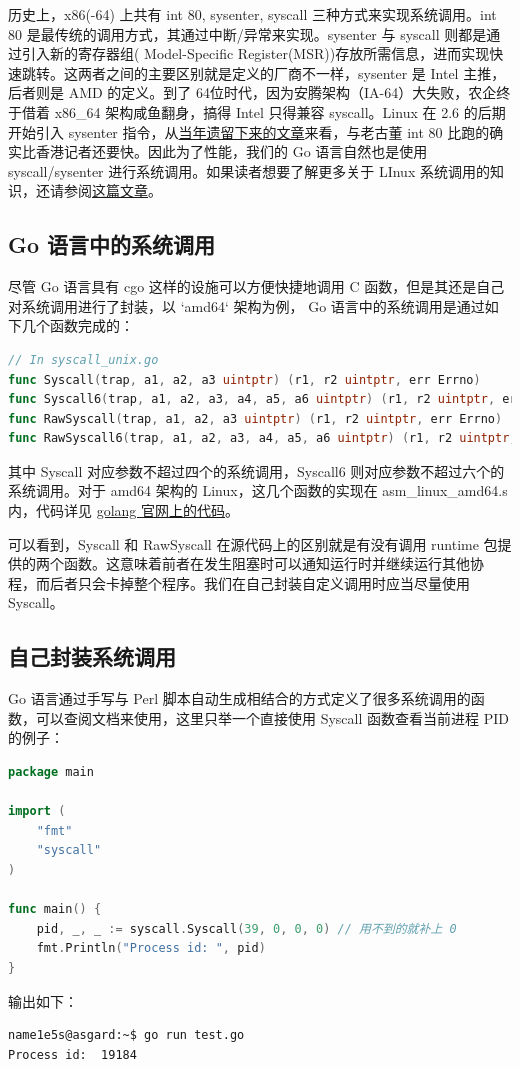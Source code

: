 \documentclass[blue,normal,cn]{elegantnote}
\begin{document}
历史上，x86(-64) 上共有 int 80, sysenter, syscall 三种方式来实现系统调用。int 80 是最传统的调用方式，其通过中断/异常来实现。sysenter 与 syscall 则都是通过引入新的寄存器组( Model-Specific Register(MSR))存放所需信息，进而实现快速跳转。这两者之间的主要区别就是定义的厂商不一样，sysenter 是 Intel 主推，后者则是 AMD 的定义。到了 64位时代，因为安腾架构（IA-64）大失败，农企终于借着 x86\_64 架构咸鱼翻身，搞得 Intel 只得兼容 syscall。Linux 在 2.6 的后期开始引入 sysenter 指令，从\href{https://www.ibm.com/developerworks/cn/linux/kernel/l-k26ncpu/index.html}{当年遗留下来的文章}来看，与老古董 int 80 比跑的确实比香港记者还要快。因此为了性能，我们的 Go 语言自然也是使用 syscall/sysenter 进行系统调用。如果读者想要了解更多关于 LInux 系统调用的知识，还请参阅\href{https://blog.packagecloud.io/eng/2016/04/05/the-definitive-guide-to-linux-system-calls/}{这篇文章}。

\subsection{Go 语言中的系统调用}

尽管 Go 语言具有 cgo 这样的设施可以方便快捷地调用 C 函数，但是其还是自己对系统调用进行了封装，以 `amd64` 架构为例， Go 语言中的系统调用是通过如下几个函数完成的：
\begin{lstlisting}[language=go]
// In syscall_unix.go
func Syscall(trap, a1, a2, a3 uintptr) (r1, r2 uintptr, err Errno)
func Syscall6(trap, a1, a2, a3, a4, a5, a6 uintptr) (r1, r2 uintptr, err Errno)
func RawSyscall(trap, a1, a2, a3 uintptr) (r1, r2 uintptr, err Errno)
func RawSyscall6(trap, a1, a2, a3, a4, a5, a6 uintptr) (r1, r2 uintptr, err Errno)
\end{lstlisting}

其中 Syscall 对应参数不超过四个的系统调用，Syscall6 则对应参数不超过六个的系统调用。对于 amd64 架构的 Linux，这几个函数的实现在 asm\_linux\_amd64.s 内，代码详见 \href{https://golang.org/src/syscall/asm_linux_amd64.s}{golang 官网上的代码}。

可以看到，Syscall 和 RawSyscall 在源代码上的区别就是有没有调用 runtime 包提供的两个函数。这意味着前者在发生阻塞时可以通知运行时并继续运行其他协 程，而后者只会卡掉整个程序。我们在自己封装自定义调用时应当尽量使用 Syscall。

\subsection{自己封装系统调用}
Go 语言通过手写与 Perl 脚本自动生成相结合的方式定义了很多系统调用的函数，可以查阅文档来使用，这里只举一个直接使用 Syscall 函数查看当前进程 PID 的例子：
\begin{lstlisting}[language=go]
package main

import (
	"fmt"
	"syscall"
)

func main() {
	pid, _, _ := syscall.Syscall(39, 0, 0, 0) // 用不到的就补上 0
	fmt.Println("Process id: ", pid)
}
\end{lstlisting}
输出如下：
\begin{lstlisting}
name1e5s@asgard:~$ go run test.go 
Process id:  19184
\end{lstlisting}
\end{document}
